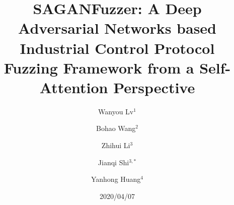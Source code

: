 \documentclass[conference]{IEEEtran}
\begin{document}
\title{SAGANFuzzer: A Deep Adversarial Networks based Industrial Control Protocol Fuzzing Framework from a Self-Attention Perspective \\}
%
\author{Wanyou Lv$^{1}$ \and
	Bohao Wang$^{2}$ \and
	Zhihui Li$^{3}$ \and
	Jianqi Shi$^{3,*}$ \and
	Yanhong Huang$^{4}$
}



\date{2020/04/07}



\maketitle
\end{document}
